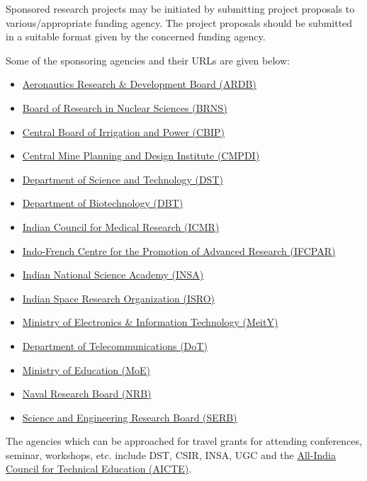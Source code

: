 \documentclass[
  10pt,
  a5paper,
  10pt,
  openany]{amsbook}
\providecommand{\tightlist}{%
  \setlength{\itemsep}{0pt}\setlength{\parskip}{0pt}}
\begin{document}
Sponsored research projects may be initiated by submitting project
proposals to various/appropriate funding agency. The project proposals
should be submitted in a suitable format given by the concerned funding
agency.

Some of the sponsoring agencies and their URLs are given below:

\begin{itemize}
\tightlist
\item
  \href{https://www.drdo.gov.in/aeronautics-research-development/about-us}{Aeronautics
  Research \& Development Board (ARDB)}
\item
  \href{https://brns.res.in/}{Board of Research in Nuclear Sciences
  (BRNS)}
\item
  \href{http://cbip.org/}{Central Board of Irrigation and Power (CBIP)}
\item
  \href{https://www.cmpdi.co.in/en}{Central Mine Planning and Design
  Institute (CMPDI)}
\item
  \href{https://dst.gov.in/}{Department of Science and Technology (DST)}
\item
  \href{https://dbtindia.gov.in/}{Department of Biotechnology (DBT)}
\item
  \href{https://www.icmr.nic.in/}{Indian Council for Medical Research
  (ICMR)}
\item
  \href{https://www.cefipra.org/home.htm}{Indo-French Centre for the
  Promotion of Advanced Research (IFCPAR)}
\item
  \href{http://insaindia.org/index.php}{Indian National Science Academy
  (INSA)}
\item
  \href{https://www.isro.gov.in/}{Indian Space Research Organization
  (ISRO)}
\item
  \href{https://www.meity.gov.in/}{Ministry of Electronics \&
  Information Technology (MeitY)}
\item
  \href{https://www.dot.gov.in}{Department of Telecommunications (DoT)}
\item
  \href{https://www.education.gov.in/}{Ministry of Education (MoE)}
\item
  \href{https://www.drdo.gov.in/naval-research-board/about-us}{Naval
  Research Board (NRB)}
\item
  \href{http://serbonline.in}{Science and Engineering Research Board
  (SERB)}
\end{itemize}

The agencies which can be approached for travel grants for attending
conferences, seminar, workshops, etc. include DST, CSIR, INSA, UGC and
the \href{https://www.aicte-india.org/}{All-India Council for Technical
Education (AICTE)}.
\end{document}

